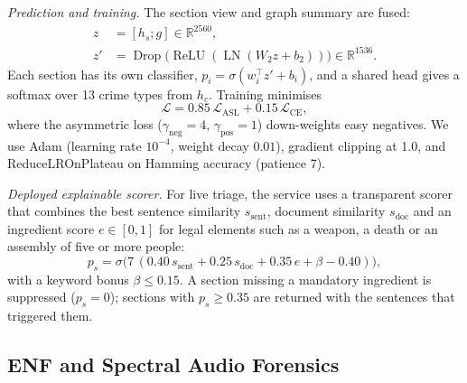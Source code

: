 \documentclass[conference]{IEEEtran}
\begin{document}
\textit{Prediction and training.} The section view and graph summary are fused:
\begin{equation}
\begin{aligned}
z&=[h_s;g]\in\mathbb{R}^{2560},\\
z'&=\operatorname{Drop}\bigl(\operatorname{ReLU}(\operatorname{LN}(W_2z+b_2))\bigr)\in\mathbb{R}^{1536}.
\end{aligned}
\label{eq:bns_fuse}
\end{equation}
Each section has its own classifier, $p_i=\sigma(w_i^{\top}z'+b_i)$, and a shared head gives a softmax over 13 crime types from $h_c$. Training minimises
\begin{equation}
\mathcal L=0.85\,\mathcal L_{\text{ASL}}+0.15\,\mathcal L_{\text{CE}},
\label{eq:loss}
\end{equation}
where the asymmetric loss ($\gamma_{\text{neg}}=4$, $\gamma_{\text{pos}}=1$) down-weights easy negatives. We use Adam (learning rate $10^{-4}$, weight decay $0.01$), gradient clipping at 1.0, and ReduceLROnPlateau on Hamming accuracy (patience 7).

\textit{Deployed explainable scorer.} For live triage, the service uses a transparent scorer that combines the best sentence similarity $s_{\text{sent}}$, document similarity $s_{\text{doc}}$ and an ingredient score $e\in[0,1]$ for legal elements such as a weapon, a death or an assembly of five or more people:
\begin{equation}
p_s=\sigma\bigl(7\,(0.40\,s_{\text{sent}}+0.25\,s_{\text{doc}}+0.35\,e+\beta-0.40)\bigr),
\label{eq:served}
\end{equation}
with a keyword bonus $\beta\le0.15$. A section missing a mandatory ingredient is suppressed ($p_s=0$); sections with $p_s\ge0.35$ are returned with the sentences that triggered them.

\subsection{ENF and Spectral Audio Forensics}
\label{subsec:audio}
\end{document}
